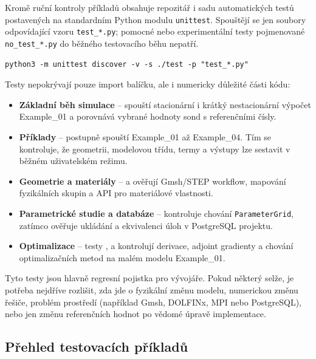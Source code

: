 \documentclass[a4paper,11pt]{article}
\begin{document}
Kromě ruční kontroly příkladů obsahuje repozitář i sadu automatických testů
postavených na standardním Python modulu \texttt{unittest}. Spouštějí se jen
soubory odpovídající vzoru \texttt{test\_*.py}; pomocné nebo experimentální testy
pojmenované \texttt{no\_test\_*.py} do běžného testovacího běhu nepatří.

\begin{lstlisting}[style=bash]
python3 -m unittest discover -v -s ./test -p "test_*.py"
\end{lstlisting}

Testy nepokrývají pouze import balíčku, ale i numericky důležité části kódu:

\begin{itemize}[leftmargin=*]
  \item \textbf{Základní běh simulace} --  spouští
        stacionární i krátký nestacionární výpočet Example\_01 a porovnává vybrané
        hodnoty sond s referenčními čísly.
  \item \textbf{Příklady} --  postupně spouští Example\_01
        až Example\_04. Tím se kontroluje, že geometrii, modelovou třídu, termy
        a výstupy lze sestavit v běžném uživatelském režimu.
  \item \textbf{Geometrie a materiály} --  a
         ověřují Gmsh/STEP workflow, mapování fyzikálních
        skupin a API pro materiálové vlastnosti.
  \item \textbf{Parametrické studie a databáze} --  kontroluje
        chování \texttt{ParameterGrid}, zatímco  ověřuje
        ukládání a ekvivalenci úloh v PostgreSQL projektu.
  \item \textbf{Optimalizace} -- testy ,
         a  kontrolují
        derivace, adjoint gradienty a chování optimalizačních metod na malém
        modelu Example\_01.
\end{itemize}

Tyto testy jsou hlavně regresní pojistka pro vývojáře. Pokud některý selže,
je potřeba nejdříve rozlišit, zda jde o fyzikální změnu modelu, numerickou změnu
řešiče, problém prostředí (například Gmsh, DOLFINx, MPI nebo PostgreSQL), nebo
jen změnu referenčních hodnot po vědomé úpravě implementace.

\subsection*{Přehled testovacích příkladů}
\end{document}
